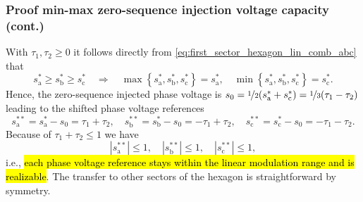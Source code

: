 \begin{frame}
    \frametitle{Proof min-max zero-sequence injection voltage capacity (cont.)}
    With $\tau_1, \tau_2 \geq 0$ it follows directly from \eqref{eq:first_sector_hexagon_lin_comb_abc} that
    \begin{equation}
        s_\mathrm{a}^* \geq s_\mathrm{b}^* \geq s_\mathrm{c}^* \quad \Rightarrow \quad  \max\left\{s_\mathrm{a}^*, s_\mathrm{b}^*, s_\mathrm{c}^*\right\} = s_\mathrm{a}^*, \quad \min\left\{s_\mathrm{a}^*, s_\mathrm{b}^*, s_\mathrm{c}^*\right\} = s_\mathrm{c}^*.
    \end{equation}\pause
    Hence, the zero-sequence injected phase voltage is $s_0 = \nicefrac{1}{2}(s_\mathrm{a}^* + s_\mathrm{c}^*)=\nicefrac{1}{3}(\tau_1 - \tau_2)$ leading to the shifted phase voltage references
    \begin{equation}
        s_\mathrm{a}^{**} = s_\mathrm{a}^* - s_0 = \tau_1 + \tau_2, \quad s_\mathrm{b}^{**} = s_\mathrm{b}^* - s_0 = -\tau_1 + \tau_2, \quad s_\mathrm{c}^{**} = s_\mathrm{c}^* - s_0 = -\tau_1 -\tau_2.
        \label{eq:shifted_three_phase_PWM_modulation_indices_min_max}
    \end{equation}\pause
    Because of $\tau_1 + \tau_2 \leq 1$ we have
    \begin{equation}
        |s_\mathrm{a}^{**}| \leq 1, \quad |s_\mathrm{b}^{**}| \leq 1, \quad |s_\mathrm{c}^{**}| \leq 1,
    \end{equation}
    i.e., \hl{each phase voltage reference stays within the linear modulation range and is realizable}. The transfer to other sectors of the hexagon is straightforward by symmetry.
\end{frame}

